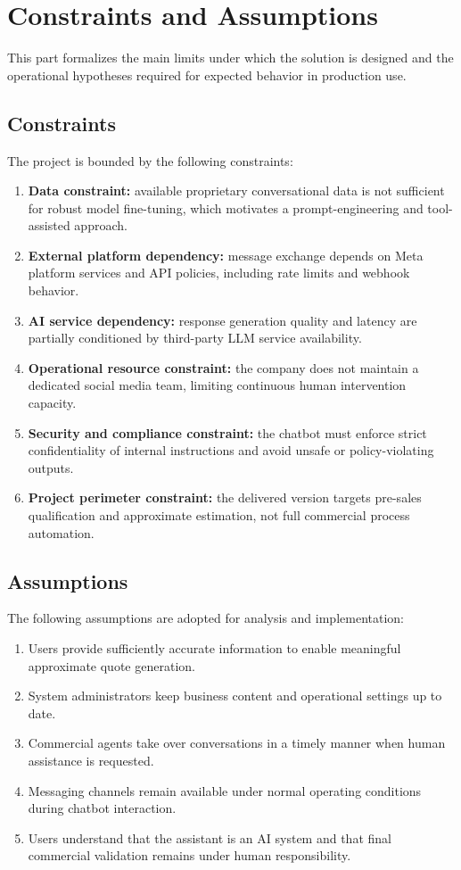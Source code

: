 \section{Constraints and Assumptions}
This part formalizes the main limits under which the solution is designed and the operational hypotheses required for expected behavior in production use.

\subsection{Constraints}
The project is bounded by the following constraints:
\begin{enumerate}
    \item \textbf{Data constraint:} available proprietary conversational data is not sufficient for robust model fine-tuning, which motivates a prompt-engineering and tool-assisted approach.
    \item \textbf{External platform dependency:} message exchange depends on Meta platform services and API policies, including rate limits and webhook behavior.
    \item \textbf{AI service dependency:} response generation quality and latency are partially conditioned by third-party LLM service availability.
    \item \textbf{Operational resource constraint:} the company does not maintain a dedicated social media team, limiting continuous human intervention capacity.
    \item \textbf{Security and compliance constraint:} the chatbot must enforce strict confidentiality of internal instructions and avoid unsafe or policy-violating outputs.
    \item \textbf{Project perimeter constraint:} the delivered version targets pre-sales qualification and approximate estimation, not full commercial process automation.
\end{enumerate}

\subsection{Assumptions}
The following assumptions are adopted for analysis and implementation:
\begin{enumerate}
    \item Users provide sufficiently accurate information to enable meaningful approximate quote generation.
    \item System administrators keep business content and operational settings up to date.
    \item Commercial agents take over conversations in a timely manner when human assistance is requested.
    \item Messaging channels remain available under normal operating conditions during chatbot interaction.
    \item Users understand that the assistant is an AI system and that final commercial validation remains under human responsibility.
\end{enumerate}

